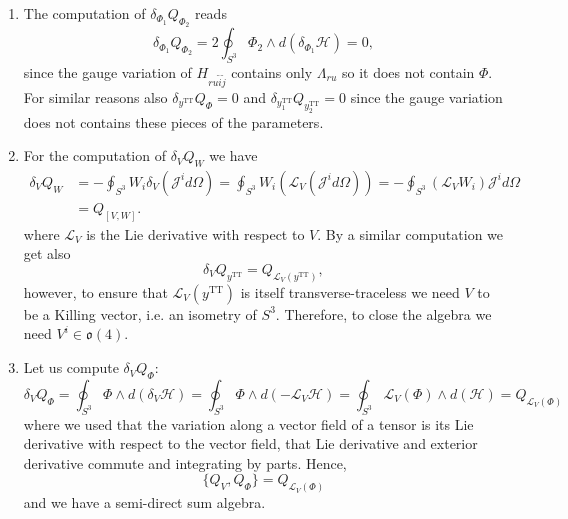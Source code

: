 \documentclass[a4paper,12pt]{article}
\begin{document}
\begin{enumerate}
    \item The computation of $\delta_{\Phi_1} Q_{\Phi_2}$ reads
    \begin{equation}
        \delta_{\Phi_1} Q_{\Phi_2}=2\oint_{S^3}\Phi_2 \wedge d(\delta_{\Phi_1}\mathcal{H})=0,
    \end{equation}
    since the gauge variation of $H_{ru\tilde{i}\tilde{j}}$ contains only $\Lambda_{ru}$ so it does not contain $\Phi$. For similar reasons also $\delta_{y^\text{TT}} Q_{\Phi}=0$ and $\delta_{y_1^\text{TT}} Q_{y_2^\text{TT}}=0$ since the gauge variation does not contains these pieces of the parameters.
    \item For the computation of $\delta_{V} Q_{W}$ we have
    \begin{equation}
    \begin{aligned}
        \delta_{V} Q_{W}&=-\oint_{S^3}W_i\delta_{V}(\mathcal{J}^id\Omega)=\oint_{S^3}W_i(\mathcal{L}_{V}(\mathcal{J}^id\Omega))=-\oint_{S^3}(\mathcal{L}_{V}W_i)\mathcal{J}^id\Omega\\
        &=Q_{[V,W]}.
    \end{aligned}
    \end{equation}
    where $\mathcal{L}_V$ is the Lie derivative with respect to $V$. By a similar computation we get also
    \begin{equation}
        \delta_{V} Q_{y^\text{TT}}=Q_{\mathcal{L}_V(y^{\text{TT}})},
    \end{equation}
    however, to ensure that $\mathcal{L}_V(y^{\text{TT}})$ is itself transverse-traceless we need $V$ to be a Killing vector, i.e. an isometry of $S^3$. Therefore, to close the algebra we need $V^i \in \mathfrak{o}(4)$. 
    \item Let us compute $\delta_V Q_\Phi$:
\begin{equation}
    \delta_V Q_\Phi = \oint_{S^3} \Phi \wedge d(\delta_V \mathcal{H}) =  \oint_{S^3} \Phi \wedge d(-\mathcal{L}_V \mathcal{H})= \oint_{S^3} \mathcal{L}_V(\Phi) \wedge d(\mathcal{H})=Q_{\mathcal{L}_V(\Phi)}
\end{equation}
where we used that the variation along a vector field of a tensor is its Lie derivative with respect to the vector field, that Lie derivative and exterior derivative commute and integrating by parts. Hence,
\begin{equation}
    \{Q_{V}, Q_{\Phi}\}=Q_{\mathcal{L}_V(\Phi)}
\end{equation}
and we have a semi-direct sum algebra.
\end{enumerate}
\end{document}
